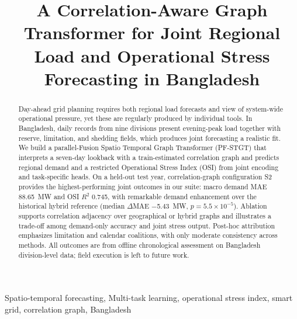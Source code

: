 \documentclass[conference]{IEEEtran}
\begin{document}
\raggedbottom

\title{A Correlation-Aware Graph Transformer for Joint Regional Load and Operational Stress Forecasting in Bangladesh}



\maketitle

\begin{abstract}
Day-ahead grid planning requires both regional load forecasts and view of system-wide operational pressure, yet these are regularly produced by individual tools. In Bangladesh, daily records from nine divisions present evening-peak load together with reserve, limitation, and shedding fields, which produces joint forecasting a realistic fit. We build a parallel-Fusion Spatio Temporal Graph Transformer (PF-STGT) that interprets a seven-day lookback with a train-estimated correlation graph and predicts regional demand and a restricted Operational Stress Index (OSI) from joint encoding and task-specific heads. On a held-out test year, correlation-graph configuration S2 provides the highest-performing joint outcomes in our suite: macro demand MAE 88.65~MW and OSI $R^2$ 0.745, with remarkable demand enhancement over the historical hybrid reference (median $\Delta$MAE $-$5.43~MW, $p = 5.5 \times 10^{-5}$). Ablation supports correlation adjacency over geographical or hybrid graphs and illustrates a trade-off among demand-only accuracy and joint stress output. Post-hoc attribution emphasizes limitation and calendar coalitions, with only moderate consistency across methods. All outcomes are from offline chronological assessment on Bangladesh division-level data; field execution is left to future work. 
\end{abstract}

\begin{IEEEkeywords}
Spatio-temporal forecasting, Multi-task learning, operational stress index, smart grid, correlation graph, Bangladesh
\end{IEEEkeywords}










\end{document}
